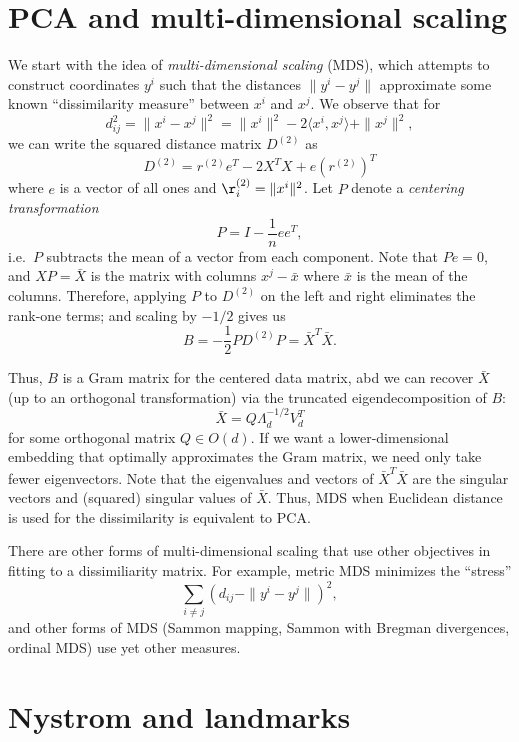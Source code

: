 \documentclass[12pt, leqno]{article} %
\begin{document}
\section{PCA and multi-dimensional scaling}


We start with the idea of {\em multi-dimensional scaling} (MDS), which
attempts to construct coordinates $y^i$ such that the distances
$\|y^i-y^j\|$ approximate some known ``dissimilarity measure''
between $x^i$ and $x^j$.  We observe that for
\[
  d_{ij}^2 = \|x^i-x^j\|^2 = \|x^i\|^2 - 2 \langle x^i, x^j \rangle + \|x^j\|^2,
\]
we can write the squared distance matrix $D^{(2)}$ as
\[
  D^{(2)} = r^{(2)} e^T - 2 X^T X + e (r^{(2)})^T
\]
where $e$ is a vector of all ones and $\r^{(2)}_i = \|x^i\|^2$.
Let $P$ denote a {\em centering transformation}
\[
  P = I - \frac{1}{n} ee^T,
\]
i.e.~$P$ subtracts the mean of a vector from each component.
Note that $Pe = 0$, and $XP = \bar{X}$ is the matrix
with columns $x^j - \bar{x}$ where $\bar{x}$ is the mean of the
columns.  Therefore, applying $P$ to $D^{(2)}$ on the left and right
eliminates the rank-one terms; and scaling by $-1/2$ gives us
\[
  B = -\frac{1}{2} PD^{(2)}P = \bar{X}^T \bar{X}.
\]

Thus, $B$ is a Gram matrix for the centered data matrix, abd we can
recover $\bar{X}$ (up to an orthogonal transformation) via the
truncated eigendecomposition of $B$:
\[
  \bar{X} = Q \Lambda_d^{-1/2} V_d^T
\]
for some orthogonal matrix $Q \in O(d)$.  If we want a
lower-dimensional embedding that optimally approximates the Gram
matrix, we need only take fewer eigenvectors.  Note that the
eigenvalues and vectors of $\bar{X}^T \bar{X}$ are the singular
vectors and (squared) singular values of $\bar{X}$.  Thus, MDS when
Euclidean distance is used for the dissimilarity is equivalent to PCA.

There are other forms of multi-dimensional scaling that use other
objectives in fitting to a dissimiliarity matrix.  For example, metric
MDS minimizes the ``stress''
\[
  \sum_{i \neq j} (d_{ij}-\|y^i-y^j\|)^2,
\]
and other forms of MDS (Sammon mapping, Sammon with Bregman
divergences, ordinal MDS) use yet other measures.

\section{Nystrom and landmarks}
\end{document}
